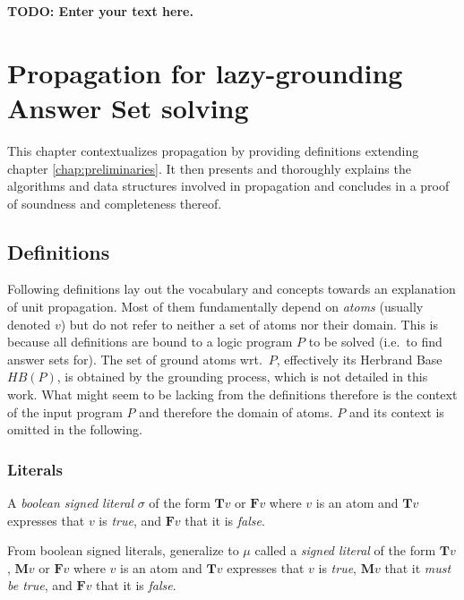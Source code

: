 \documentclass{vutinfth} %
\newcommand{\todo}[1]{{\color{red}\textbf{TODO: {#1}}}} %
\theoremstyle{example}
\theoremstyle{definition}
\newtheorem{definition}{Definition}[section]
\theoremstyle{theorem}
\theoremstyle{lemma}
\theoremstyle{corollary}
\newcommand{\bT}{\mathbf{T}}
\newcommand{\bM}{\mathbf{M}}
\newcommand{\bF}{\mathbf{F}}
\newcommand{\sgl}{\mu}
\newcommand{\bsgl}{\sigma}
\begin{document}
\todo{Enter your text here.}

\chapter{Propagation for lazy-grounding Answer Set solving}

This chapter contextualizes propagation by providing definitions extending chapter \ref{chap:preliminaries}. It then presents and thoroughly explains the algorithms and data structures involved in propagation and concludes in a proof of soundness and completeness thereof.

\section{Definitions}


Following definitions lay out the vocabulary and concepts towards an explanation of unit propagation. Most of them fundamentally depend on \emph{atoms} (usually denoted $v$) but do not refer to neither a set of atoms nor their domain. This is because all definitions are bound to a logic program $P$ to be solved (i.e.~to find answer sets for). The set of ground atoms wrt.~$P$, effectively its Herbrand Base $\textit{HB}(P)$, is obtained by the grounding process, which is not detailed in this work. What might seem to be lacking from the definitions therefore is the context of the input program $P$ and therefore the domain of atoms. $P$ and its context is omitted in the following.

\subsection{Literals}


A \emph{boolean signed literal} $\bsgl$ of the form $\bT v$ or $\bF v$ where $v$ is an atom and  $\bT v$ expresses that $v$ is \emph{true}, and $\bF v$ that it is \emph{false}.

From boolean signed literals, generalize to $\sgl$ called a \emph{signed literal} of the form $\bT v$, $\bM v$ or $\bF v$ where $v$ is an atom and $\bT v$ expresses that $v$ is \emph{true}, $\bM v$ that it \emph{must be true}, and $\bF v$ that it is \emph{false}.
\end{document}
